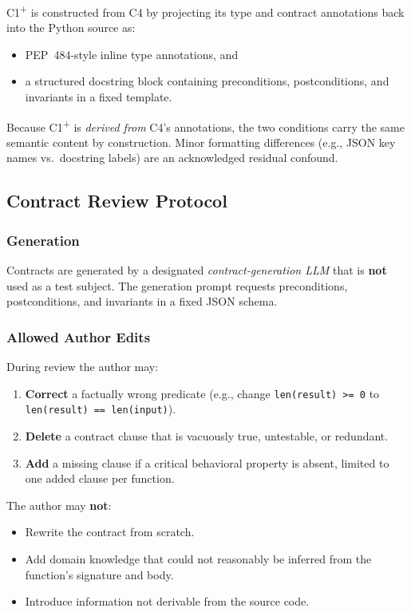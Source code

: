 \documentclass[11pt]{article}
\begin{document}
C1\textsuperscript{+} is constructed from C4 by projecting its type
and contract annotations back into the Python source as:
\begin{itemize}[nosep]
  \item PEP~484-style inline type annotations, and
  \item a structured docstring block containing preconditions,
        postconditions, and invariants in a fixed template.
\end{itemize}
Because C1\textsuperscript{+} is \emph{derived from} C4's annotations,
the two conditions carry the same semantic content by construction.
Minor formatting differences (e.g., JSON key names vs.\ docstring
labels) are an acknowledged residual confound.


\subsection{Contract Review Protocol}

\subsubsection*{Generation}

Contracts are generated by a designated \emph{contract-generation LLM}
that is \textbf{not} used as a test subject.  The generation prompt
requests preconditions, postconditions, and invariants in a fixed JSON
schema.

\subsubsection*{Allowed Author Edits}

During review the author may:
\begin{enumerate}[nosep]
  \item \textbf{Correct} a factually wrong predicate (e.g., change
        \texttt{len(result) >= 0} to \texttt{len(result) == len(input)}).
  \item \textbf{Delete} a contract clause that is vacuously true,
        untestable, or redundant.
  \item \textbf{Add} a missing clause if a critical behavioral property
        is absent, limited to one added clause per function.
\end{enumerate}

The author may \textbf{not}:
\begin{itemize}[nosep]
  \item Rewrite the contract from scratch.
  \item Add domain knowledge that could not reasonably be inferred from
        the function's signature and body.
  \item Introduce information not derivable from the source code.
\end{itemize}
\end{document}
